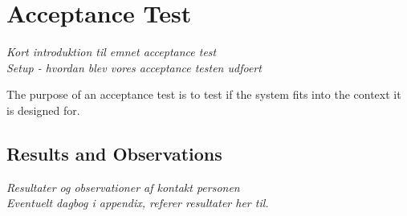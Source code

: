 \section{Acceptance Test}
\textit{Kort introduktion til emnet acceptance test\\
Setup - hvordan blev vores acceptance testen udfoert}

The purpose of an acceptance test\cite{misc:designInterSys} is to test if the system fits into the context it is designed for.

\subsection{Results and Observations}
\textit{Resultater og observationer af kontakt personen\\
Eventuelt dagbog i appendix, referer resultater her til.}